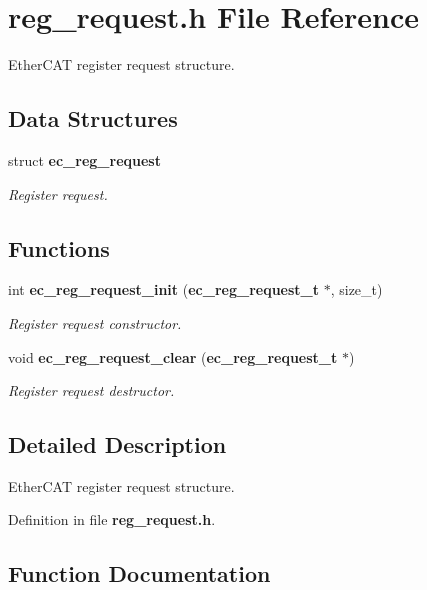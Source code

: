 \section{reg\-\_\-request.\-h File Reference}
\label{reg__request_8h}


Ether\-C\-A\-T register request structure.  


\subsection*{Data Structures}
\begin{DoxyCompactItemize}
\item 
struct {\bf ec\-\_\-reg\-\_\-request}
\begin{DoxyCompactList}\small\item\em Register request. \end{DoxyCompactList}\end{DoxyCompactItemize}
\subsection*{Functions}
\begin{DoxyCompactItemize}
\item 
int {\bf ec\-\_\-reg\-\_\-request\-\_\-init} ({\bf ec\-\_\-reg\-\_\-request\-\_\-t} $\ast$, size\-\_\-t)
\begin{DoxyCompactList}\small\item\em Register request constructor. \end{DoxyCompactList}\item 
void {\bf ec\-\_\-reg\-\_\-request\-\_\-clear} ({\bf ec\-\_\-reg\-\_\-request\-\_\-t} $\ast$)\label{reg__request_8h_a5614fa1fafcc1fc19898a881e364738c}

\begin{DoxyCompactList}\small\item\em Register request destructor. \end{DoxyCompactList}\end{DoxyCompactItemize}


\subsection{Detailed Description}
Ether\-C\-A\-T register request structure. 

Definition in file {\bf reg\-\_\-request.\-h}.



\subsection{Function Documentation}
